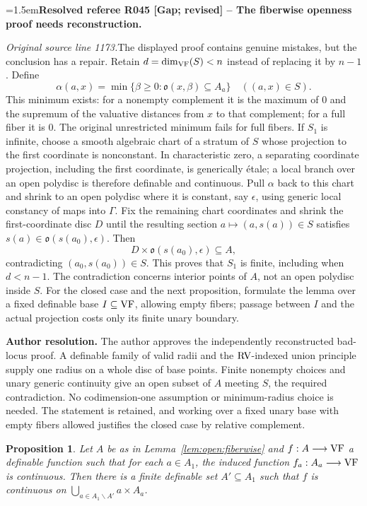 \documentclass[12pt]{amsart}
\newcommand{\ResolvedRefereeRemark}[5]{%
  \par\medskip\begingroup\normalfont\small\color{gray}%
  \emergencystretch=1.5em\noindent\textbf{Resolved referee R#1 [#2] -- #3.}\par\nobreak\noindent #4\par
  \medskip\color{ResolutionGreen}\noindent\textbf{Author resolution.} #5\par
  \endgroup\medskip
}
\theoremstyle{plain}
\newtheorem{prop}[thm]{Proposition}
\theoremstyle{definition}
\theoremstyle{remark}
\numberwithin{equation}{section}
\theoremstyle{plain}
\newcommand{\VF}{\textup{VF}}
\newcommand{\RV}{\textup{RV}}
\newcommand{\go}{\mathfrak{o}}
\newcommand{\0}{\emptyset}
\newcommand{\fun}{\longrightarrow}
\newcommand{\sub}{\subseteq}
\newcommand{\mi}{\smallsetminus}
\begin{document}
\ResolvedRefereeRemark{045}{Gap; revised}{The fiberwise openness proof needs reconstruction}{%
\textit{Original source line 1173.}\quad The displayed proof contains genuine mistakes, but the conclusion has a repair. Retain $d=\dim_{\VF}(S)<n$ instead of replacing it by $n-1$. Define
\[
 \alpha(a,x)=\min\{\beta\geq0:\go(x,\beta)\subseteq A_a\}\quad ((a,x)\in S).
\]
This minimum exists: for a nonempty complement it is the maximum of $0$ and the supremum of the valuative distances from $x$ to that complement; for a full fiber it is $0$. The original unrestricted minimum fails for full fibers. If $S_1$ is infinite, choose a smooth algebraic chart of a stratum of $S$ whose projection to the first coordinate is nonconstant. In characteristic zero, a separating coordinate projection, including the first coordinate, is generically \'etale; a local branch over an open polydisc is therefore definable and continuous. Pull $\alpha$ back to this chart and shrink to an open polydisc where it is constant, say $\epsilon$, using generic local constancy of maps into $\Gamma$. Fix the remaining chart coordinates and shrink the first-coordinate disc $D$ until the resulting section $a\mapsto(a,s(a))\in S$ satisfies $s(a)\in\go(s(a_0),\epsilon)$. Then
\[
 D\times\go(s(a_0),\epsilon)\subseteq A,
\]
contradicting $(a_0,s(a_0))\in S$. This proves that $S_1$ is finite, including when $d<n-1$. The contradiction concerns interior points of $A$, not an open polydisc inside $S$. For the closed case and the next proposition, formulate the lemma over a fixed definable base $I\subseteq\VF$, allowing empty fibers; passage between $I$ and the actual projection costs only its finite unary boundary.
}{The author approves the independently reconstructed bad-locus proof. A definable family of valid radii and the $\RV$-indexed union principle supply one radius on a whole disc of base points. Finite nonempty choices and unary generic continuity give an open subset of $A$ meeting $S$, the required contradiction. No codimension-one assumption or minimum-radius choice is needed. The statement is retained, and working over a fixed unary base with empty fibers allowed justifies the closed case by relative complement.}



\begin{prop}\label{prop:continuity:fiberwise}
Let $A$ be as in Lemma~\ref{lem:open:fiberwise} and $f : A \fun \VF$  a definable function such that
for each $a \in A_1$, the induced function $f_a : A_a \fun \VF$ is continuous.
Then there is a finite definable set $A' \sub A_1$ such that $f$ is continuous on
$\bigcup_{a\in A_1 \mi A'} a \times A_a$.
\end{prop}
\end{document}
